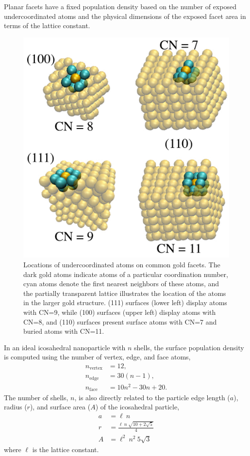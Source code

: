 \documentclass[journal = jpccck, manuscript = suppinfo]{achemso}
\begin{document}
Planar facets have a fixed population density based on the number of
exposed undercoordinated atoms and the physical dimensions of the
exposed facet area in terms of the lattice constant.
\begin{figure}[!htb]
	\includegraphics[width=5in]{figures/facets-cn.pdf}
	\caption{Locations of undercoordinated atoms on common gold
          facets. The dark gold atoms indicate atoms of a particular
          coordination number, cyan atoms denote the first nearest
          neighbors of these atoms, and the partially transparent
          lattice illustrates the location of the atoms in the larger
          gold structure. (111) surfaces (lower left) display atoms
          with CN=9, while (100) surfaces (upper left) display atoms
          with CN=8, and (110) surfaces present surface atoms with
          CN=7 and buried atoms with CN=11. }
	\label{fig:facets-cn}
\end{figure}


In an ideal icosahedral nanoparticle with $n$ shells, the surface
population density is computed using the number of vertex, edge, and
face atoms,
\begin{align}
n_\text{vertex} & = 12, \\
n_\text{edge} & = 30 (n -1), \\
n_\text{face} & = 10 n^2 - 30 n + 20.
\end{align}  
The number of shells, $n$, is also directly related to the particle
edge length ($a$), radius ($r$), and surface area ($A$) of the
icosahedral particle,
\begin{align}
a & = \ell~n \\
r & = \frac{\ell~n~\sqrt{10+2\sqrt{5}}}{4} \\
A & =  \ell^2~n^2~ 5 \sqrt{3}
\end{align}
where $\ell$ is the lattice constant.
\end{document}
